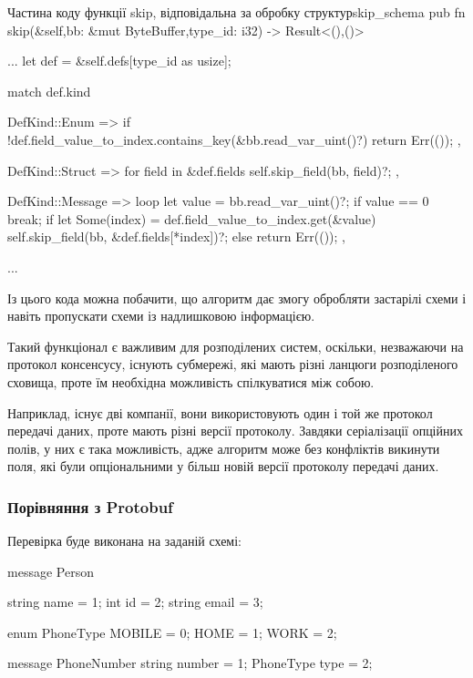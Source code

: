 \documentclass{lib/styles/default-style}
\begin{document}
    \begin{code}{Частина коду функції skip, відповідальна за обробку структур}{skip_schema}
        pub fn skip(&self,bb: &mut ByteBuffer,type_id: i32) -> Result<(),()> {
        ...
                let def = &self.defs[type_id as usize];

                match def.kind {
                DefKind::Enum => {
                    if !def.field_value_to_index.contains_key(&bb.read_var_uint()?) {
                    return Err(());
                    }
                },

                DefKind::Struct => {
                    for field in &def.fields {
                    self.skip_field(bb, field)?;
                    }
                },

                DefKind::Message => {
                    loop {
                    let value = bb.read_var_uint()?;
                    if value == 0 {
                        break;
                    }
                    if let Some(index) = def.field_value_to_index.get(&value) {
                        self.skip_field(bb, &def.fields[*index])?;
                    } else {
                        return Err(());
                    }
                    }
                },
            }
        ...
        }\end{code}

    Із цього кода можна побачити, що алгоритм дає змогу обробляти застарілі схеми і навіть пропускати схеми із надлишковою інформацією.

    Такий функціонал є важливим для розподілених систем, оскільки, незважаючи на протокол консенсусу,
    існують субмережі, які мають різні ланцюги розподіленого сховища, проте їм необхідна можливість спілкуватися між собою.

    Наприклад, існує дві компанії, вони використовують один і той же протокол передачі даних, проте мають різні версії протоколу.
    Завдяки серіалізації опційних полів, у них є така можливість, адже алгоритм може без конфліктів викинути поля, які були опціональними
    у більш новій версії протоколу передачі даних.

    \subsubsection{Порівняння з Protobuf}

    Перевірка буде виконана на заданій схемі:
    
    \begin{snippet}
        message Person {
            string name = 1;
            int id = 2;
            string email = 3;

            enum PhoneType {
                MOBILE = 0;
                HOME = 1;
                WORK = 2;
            }

            message PhoneNumber {
                string number = 1;
                PhoneType type = 2;
            }
        }\end{snippet}
\end{document}
